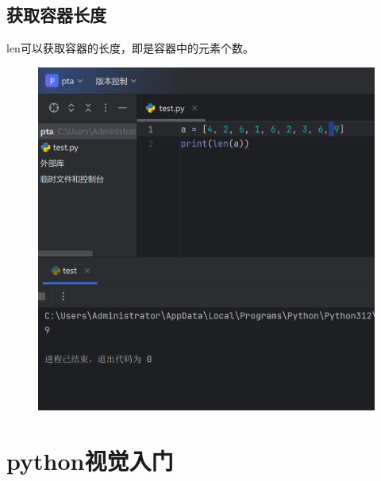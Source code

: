 \documentclass{article}
\begin{document}
\subsection{获取容器长度}
len可以获取容器的长度，即是容器中的元素个数。
\begin{figure}[H]
    \centering
    \includegraphics[width=1\linewidth]{len.png}
\end{figure}


\newpage
\section{python视觉入门}
\end{document}
